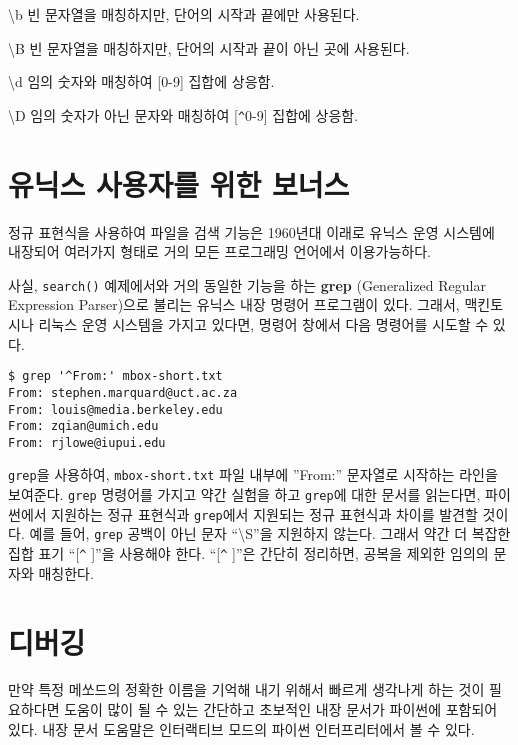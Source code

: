 {\textbackslash}b \newline
빈 문자열을 매칭하지만, 단어의 시작과 끝에만 사용된다.

{\textbackslash}B \newline
빈 문자열을 매칭하지만, 단어의 시작과 끝이 아닌 곳에 사용된다.

{\textbackslash}d \newline
임의 숫자와 매칭하여 [0-9] 집합에 상응함.

{\textbackslash}D \newline
임의 숫자가 아닌 문자와 매칭하여 [\verb"^"0-9] 집합에 상응함.

\section{유닉스 사용자를 위한 보너스}

정규 표현식을 사용하여 파일을 검색 기능은 1960년대 이래로 유닉스 운영 시스템에 내장되어
여러가지 형태로 거의 모든 프로그래밍 언어에서 이용가능하다.


사실, {\tt search()} 예제에서와 거의 동일한 기능을 하는 {\bf grep} (Generalized Regular Expression Parser)으로 불리는 유닉스 내장 명령어 프로그램이 있다.
그래서, 맥킨토시나 리눅스 운영 시스템을 가지고 있다면, 명령어 창에서 다음 명령어를 시도할 수 있다.

\beforeverb
\begin{verbatim}
$ grep '^From:' mbox-short.txt
From: stephen.marquard@uct.ac.za
From: louis@media.berkeley.edu
From: zqian@umich.edu
From: rjlowe@iupui.edu
\end{verbatim}
\afterverb
%

{\tt grep}을 사용하여, {\tt mbox-short.txt} 파일 내부에 ''From:'' 문자열로 시작하는 라인을 보여준다.
{\tt grep} 명령어를 가지고 약간 실험을 하고 {\tt grep}에 대한 문서를 읽는다면, 파이썬에서 지원하는 정규 표현식과 {\tt grep}에서 지원되는 정규 표현식과 차이를 발견할 것이다.
예를 들어, {\tt grep} 공백이 아닌 문자 ``{\textbackslash}S''을 지원하지 않는다. 그래서 약간 더 복잡한 집합 표기 ``[\verb"^" ]''을 사용해야 한다.
``[\verb"^" ]''은 간단히 정리하면, 공복을 제외한 임의의 문자와 매칭한다.

\section{디버깅}

만약 특정 메쏘드의 정확한 이름을 기억해 내기 위해서 빠르게 생각나게 하는 것이 필요하다면 도움이 많이 될 수 있는 간단하고 초보적인 내장 문서가 파이썬에 포함되어 있다.
내장 문서 도움말은 인터랙티브 모드의 파이썬 인터프리터에서 볼 수 있다.

